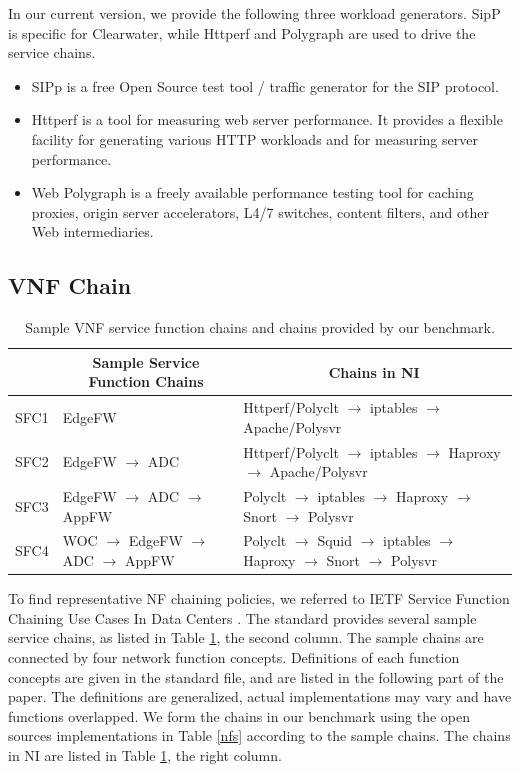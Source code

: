 In our current version, we provide the following three workload generators.
SipP is specific for Clearwater, 
while Httperf and Polygraph are used to drive the service chains.
\begin{itemize}
\item{}
SIPp \cite{}
is a free Open Source test tool / traffic generator for the SIP protocol.
\item{}
Httperf \cite{}
is a tool for measuring web server performance. It provides a flexible facility for generating various HTTP workloads and for measuring server performance.
\item{}
Web Polygraph \cite{}
is a freely available performance testing tool for caching proxies, origin server accelerators, L4/7 switches, content filters, and other Web intermediaries.
\end{itemize}

\subsection{VNF Chain}

\begin{table}[!t]
\newcommand{\tabincell}[2]{\begin{tabular}{@{}#1@{}}#2\end{tabular}}
\centering
\begin{tabular}{|l|l|l|}\hline
\textbf{} & \multicolumn{1}{c|}{\textbf{Sample Service Function Chains}} & \multicolumn{1}{c|}{\textbf{Chains in NI}} \\\hline
SFC1 & EdgeFW & Httperf/Polyclt $\to$ iptables $\to$ Apache/Polysvr \\\hline
SFC2 & EdgeFW $\to$ ADC & Httperf/Polyclt $\to$ iptables $\to$ Haproxy $\to$ Apache/Polysvr \\\hline
SFC3 & EdgeFW $\to$ ADC $\to$ AppFW & Polyclt $\to$ iptables $\to$ Haproxy $\to$ Snort $\to$ Polysvr \\\hline
SFC4 & WOC $\to$ EdgeFW $\to$ ADC $\to$ AppFW & Polyclt $\to$  Squid $\to$ iptables $\to$ Haproxy $\to$ Snort $\to$ Polysvr \\\hline
\end{tabular}
\caption{Sample VNF service function chains and chains provided by our benchmark.}
\label{chains}
\end{table}

To find representative NF chaining policies,
we referred to IETF Service Function Chaining Use Cases
In Data Centers \cite{draft-ietf-sfc-dc-use-cases-06}.
The standard provides several sample service chains,
as listed in Table \ref{chains}, the second column.
The sample chains are connected by four network function concepts.
Definitions of each function concepts are given in the standard file,
and are listed in the following part of the paper.
The definitions are generalized,
actual implementations may vary and have functions overlapped.
We form the chains in our benchmark using the open sources
implementations in Table \ref{nfs} according to the sample chains.
The chains in NI are listed in Table \ref{chains}, the right column.


